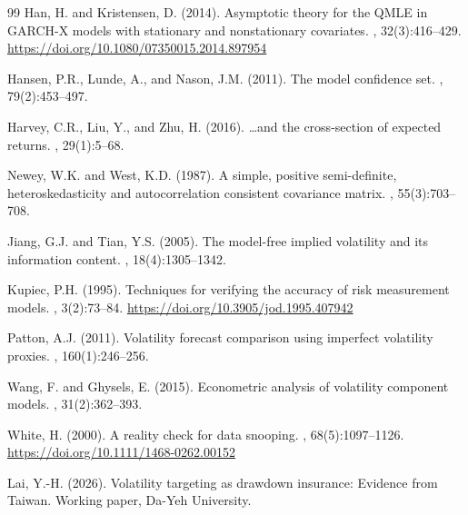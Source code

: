 \documentclass[12pt,a4paper]{article}
\begin{document}
\begin{thebibliography}{99}
Han, H. and Kristensen, D. (2014).
\newblock Asymptotic theory for the QMLE in GARCH-X models with stationary and nonstationary covariates.
, 32(3):416--429.
\newblock \url{https://doi.org/10.1080/07350015.2014.897954}

Hansen, P.R., Lunde, A., and Nason, J.M. (2011).
\newblock The model confidence set.
, 79(2):453--497.

Harvey, C.R., Liu, Y., and Zhu, H. (2016).
\newblock \ldots and the cross-section of expected returns.
, 29(1):5--68.

Newey, W.K. and West, K.D. (1987).
\newblock A simple, positive semi-definite, heteroskedasticity and autocorrelation consistent covariance matrix.
, 55(3):703--708.

Jiang, G.J. and Tian, Y.S. (2005).
\newblock The model-free implied volatility and its information content.
, 18(4):1305--1342.

Kupiec, P.H. (1995).
\newblock Techniques for verifying the accuracy of risk measurement models.
, 3(2):73--84.
\newblock \url{https://doi.org/10.3905/jod.1995.407942}

Patton, A.J. (2011).
\newblock Volatility forecast comparison using imperfect volatility proxies.
, 160(1):246--256.

Wang, F. and Ghysels, E. (2015).
\newblock Econometric analysis of volatility component models.
, 31(2):362--393.

White, H. (2000).
\newblock A reality check for data snooping.
, 68(5):1097--1126.
\newblock \url{https://doi.org/10.1111/1468-0262.00152}

Lai, Y.-H. (2026).
\newblock Volatility targeting as drawdown insurance: Evidence from Taiwan.
\newblock Working paper, Da-Yeh University.

\end{thebibliography}
\end{document}
